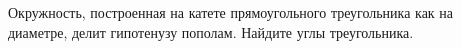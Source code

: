\begin{ex}
	\begin{condition}
		Окружность, построенная на катете прямоугольного треугольника как на диаметре, делит гипотенузу пополам. Найдите углы треугольника.
	\end{condition}
\end{ex}